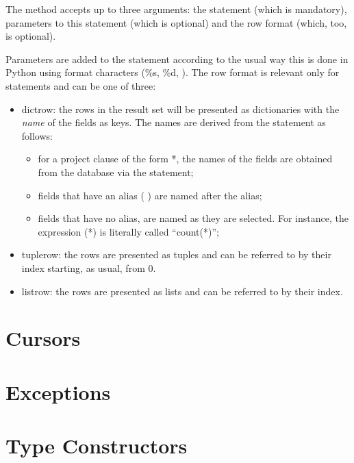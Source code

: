 The  method accepts up to three arguments:
the statement (which is mandatory), parameters to this
statement (which is optional) and the row format (which, too,
is optional).

Parameters are added to the statement according
to the usual way this is done in Python using
format characters (\%s, \%d, \etc).
The row format is relevant only for 
statements and can be one of three:

\begin{itemize}
\item dictrow: 
      the rows in the result set will be presented as dictionaries
      with the \emph{name} of the fields as keys.
      The names are derived from the statement as follows:
      \begin{itemize}
      \item for a project clause of the form  *,
            the names of the fields are obtained from the database via
            the  statement;
      \item fields that have an alias
            (   )
            are named after the alias;
      \item fields that have no alias, are named as they are selected.
            For instance, the expression (*) is
            literally called ``count(*)''; 
      \end{itemize}
\item tuplerow:
      the rows are presented as tuples and can be referred to by their index
      starting, as usual, from 0.
\item listrow:
      the rows are presented as lists and can be referred to by their index.
\end{itemize}



\section{Cursors}

\section{Exceptions}

\section{Type Constructors}
